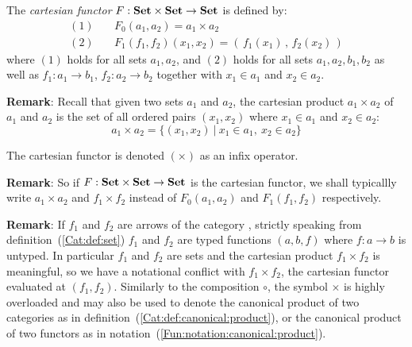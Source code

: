 \begin{defin}\label{Fun:def:cartesian}
    The {\em cartesian functor} $F:\mbox{\bf Set}\times\mbox{\bf Set}\to\mbox{\bf Set}$ is defined by:
        \begin{eqnarray*}
            (1)&\ &F_{0}(a_{1},a_{2}) = a_{1}\times a_{2}\\
            (2)&\ &F_{1}(f_{1},f_{2})(x_{1},x_{2})
                =(\,f_{1}(x_{1})\,,\,f_{2}(x_{2})\,)
        \end{eqnarray*}
    where $(1)$ holds for all sets $a_{1},a_{2}$, and $(2)$ holds for all
    sets $a_{1},a_{2},b_{1},b_{2}$ as well as $f_{1}:a_{1}\to b_{1}$, 
    $f_{2}:a_{2}\to b_{2}$ together with $x_{1}\in a_{1}$ and $x_{2}\in a_{2}$.
\end{defin}

\noindent
{\bf Remark}: Recall that given two sets $a_{1}$ and $a_{2}$, the cartesian
product $a_{1}\times a_{2}$ of $a_{1}$ and $a_{2}$ is the set of all
ordered pairs $(x_{1},x_{2})$ where $x_{1}\in a_{1}$ and $x_{2}\in a_{2}$:
    \[
    a_{1}\times a_{2}=\{(x_{1},x_{2})\ |\ x_{1}\in a_{1},\ x_{2}\in a_{2}\}
    \]

\begin{notation}\label{Fun:notation:cartesian}
    The cartesian functor is denoted $(\times)$ as an infix operator.
\end{notation}

\noindent
{\bf Remark}: So if $F:\mbox{\bf Set}\times\mbox{\bf Set}\to\mbox{\bf Set}$ is the cartesian functor, we 
shall typicallly write $a_{1}\times a_{2}$ and $f_{1}\times f_{2}$ instead
of $F_{0}(a_{1},a_{2})$ and $F_{1}(f_{1},f_{2})$ respectively.

\noindent
{\bf Remark}: If $f_{1}$ and $f_{2}$ are arrows of the category \Set, strictly
speaking from definition~(\ref{Cat:def:set}) $f_{1}$ and $f_{2}$ are typed
functions $(a,b,f)$ where $f:a\to b$ is untyped. In particular 
$f_{1}$ and $f_{2}$ are sets and the cartesian product $f_{1}\times f_{2}$ is 
meaningful, so we have a notational conflict with $f_{1}\times f_{2}$, the 
cartesian functor evaluated at $(f_{1},f_{2})$. Similarly to the composition 
$\circ$, the symbol $\times$ is highly overloaded and may also be used to denote 
the canonical product of two categories as in 
definition~(\ref{Cat:def:canonical:product}), or the canonical product of
two functors as in notation~(\ref{Fun:notation:canonical:product}).

